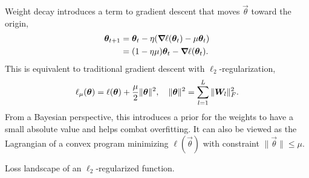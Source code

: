 Weight decay introduces a term to gradient descent that moves $\vec{\theta}$ toward the origin,
\begin{align*}
    \vec{\theta}_{t+1} & = \vec{\theta}_t - \eta \lft( \grad{\ell(\vec{\theta}_t)}{} - \mu \vec{\theta}_t \rgt) \\
                       & = \lft( 1-\eta\mu \rgt) \vec{\theta}_t - \grad{\ell(\vec{\theta}_t)}{}.
\end{align*}
This is equivalent to traditional gradient descent with $\ell_2$-regularization, \[
    \ell_{\mu}(\bm{\theta}) = \ell(\bm{\theta}) + \frac{\mu}{2} \| \bm{\theta} \|^2, \quad \| \bm{\theta} \|^2 = \sum_{l=1}^{L} \| \bm{W}_l \|_F^2.
\]
From a Bayesian perspective, this introduces a prior for the weights to have a small absolute value
and helps combat overfitting. It can also be viewed as the Lagrangian of a convex program minimizing
$\ell(\vec{\theta})$ with constraint $\| \vec{\theta} \| \leq \mu$.

\begin{marginfigure}[4cm]
    \centering
    \caption{Loss landscape of an $\ell_2$-regularized function.}
    \label{fig:l2-landscape}
\end{marginfigure}

